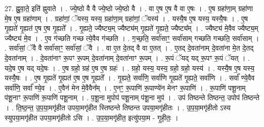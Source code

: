 \documentclass[17pt]{extarticle}
\begin{document}
27. ह्नु॒वा॒ते॒ इति॑ ह्नुवाते । . ज्ये॒ष्ठो वै वै ज्ये॒ष्ठो ज्ये॒ष्ठो वै । . वा ए॒ष ए॒ष वै वा ए॒षः । . ए॒ष ग्रहा॑णा॒म् ग्रहा॑णा मे॒ष ए॒ष ग्रहा॑णाम् । . ग्रहा॑णां॒ ॅयस्य॒ यस्य॒ ग्रहा॑णा॒म् ग्रहा॑णां॒ ॅयस्य॑ । . यस्यै॒ष ए॒ष यस्य॒ यस्यै॒षः । . ए॒ष गृ॒ह्यते॑ गृ॒ह्यत॑ ए॒ष ए॒ष गृ॒ह्यते᳚ । . गृ॒ह्यते॒ ज्यैष्ट्य॒म् ज्यैष्ट्य॑म् गृ॒ह्यते॑ गृ॒ह्यते॒ ज्यैष्ट्य᳚म् । . ज्यैष्ट्य॑ मे॒वैव ज्यैष्ट्य॒म् ज्यैष्ट्य॑ मे॒व । . ए॒व ग॑च्छति गच्छ त्ये॒वैव ग॑च्छति । . ग॒च्छ॒ति॒ सर्वा॑साꣳ॒॒ सर्वा॑साम् गच्छति गच्छति॒ सर्वा॑साम् । . सर्वा॑सां॒ ॅवै वै सर्वा॑साꣳ॒॒ सर्वा॑सां॒ ॅवै । . वा ए॒त दे॒तद् वै वा ए॒तत् । . ए॒तद् दे॒वता॑नाम् दे॒वता॑ना मे॒त दे॒तद् दे॒वता॑नाम् । . दे॒वता॑नाꣳ रू॒पꣳ रू॒पम् दे॒वता॑नाम् दे॒वता॑नाꣳ रू॒पम् । . रू॒पं ॅयद् यद् रू॒पꣳ रू॒पं ॅयत् । . यदे॒ष ए॒ष यद् यदे॒षः । . ए॒ष ग्रहो॒ ग्रह॑ ए॒ष ए॒ष ग्रहः॑ । . ग्रहो॒ यस्य॒ यस्य॒ ग्रहो॒ ग्रहो॒ यस्य॑ । . यस्यै॒ष ए॒ष यस्य॒ यस्यै॒षः । . ए॒ष गृ॒ह्यते॑ गृ॒ह्यत॑ ए॒ष ए॒ष गृ॒ह्यते᳚ । . गृ॒ह्यते॒ सर्वा॑णि॒ सर्वा॑णि गृ॒ह्यते॑ गृ॒ह्यते॒ सर्वा॑णि । . सर्वा᳚ ण्ये॒वैव सर्वा॑णि॒ सर्वा᳚ ण्ये॒व । . ए॒वैन॑ मेन मे॒वैवैन᳚म् । . ए॒नꣳ॒॒ रू॒पाणि॑ रू॒पाण्ये॑न मेनꣳ रू॒पाणि॑ । . रू॒पाणि॑ पशू॒नाम् प॑शू॒नाꣳ रू॒पाणि॑ रू॒पाणि॑ पशू॒नाम् । . प॒शू॒ना मुपोप॑ पशू॒नाम् प॑शू॒ना मुप॑ । . उप॑ तिष्ठन्ते तिष्ठन्त॒ उपोप॑ तिष्ठन्ते । . ति॒ष्ठ॒न्त॒ उ॒प॒या॒मगृ॑हीत उपया॒मगृ॑हीत स्तिष्ठन्ते तिष्ठन्त उपया॒मगृ॑हीतः । . उ॒प॒या॒मगृ॑हीतो ऽस्य स्युपया॒मगृ॑हीत उपया॒मगृ॑हीतो ऽसि । . उ॒प॒या॒मगृ॑हीत॒ इत्यु॑पया॒म - गृ॒ही॒तः॒ । \newline
\end{document}
